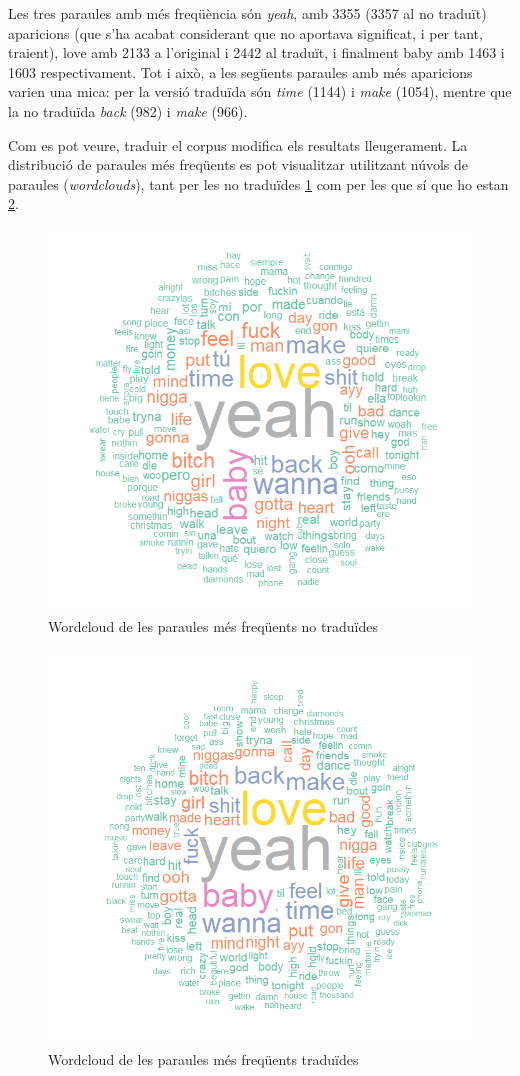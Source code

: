 Les tres paraules amb més freqüència són \textit{yeah}, amb 3355 (3357 al no traduït) aparicions (que s'ha acabat considerant que no aportava significat, i per tant, traient), love amb 2133 a l'original i 2442 al traduït, i finalment baby amb 1463 i 1603 respectivament. Tot i això, a les següents paraules amb més aparicions varien una mica: per la versió traduïda són \textit{time} (1144) i \textit{make} (1054), mentre que la no traduïda \textit{back} (982) i \textit{make} (966).

Com es pot veure, traduir el corpus modifica els resultats lleugerament. La distribució de paraules més freqüents es pot visualitzar utilitzant núvols de paraules (\textit{wordclouds}), tant per les no traduïdes \ref{fig:textual_wordcloud_complete} com per les que sí que ho estan \ref{fig:textual_wordcloud_complete_translated}.

\begin{figure}[H]
    \centering
    \includegraphics[width=0.5\linewidth]{Images//8_Textual//Analysis/complete_word_cloud.png}
    \caption{Wordcloud de les paraules més freqüents no traduïdes}
    \label{fig:textual_wordcloud_complete}
\end{figure}


\begin{figure}[H]
    \centering
    \includegraphics[width=0.5\linewidth]{Images//8_Textual//Analysis/complete_word_cloud_translated.png}
    \caption{Wordcloud de les paraules més freqüents traduïdes}
    \label{fig:textual_wordcloud_complete_translated}
\end{figure}

